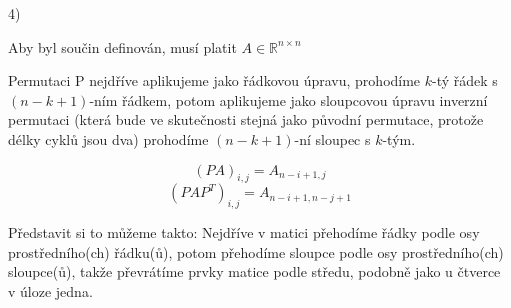 \documentclass[10pt,a4paper]{article}
\begin{document}
\hfill

4) 

Aby byl součin definován, musí platit $A \in \mathbb{R}^{n \times n}$

Permutaci P nejdříve aplikujeme jako řádkovou úpravu, prohodíme $k$-tý řádek s $(n-k + 1)$-ním řádkem, potom aplikujeme jako sloupcovou úpravu inverzní permutaci (která bude ve skutečnosti stejná jako původní permutace, protože délky cyklů jsou dva) prohodíme $(n-k + 1)$-ní sloupec s $k$-tým.


\begin{equation*}
(PA)_{i,j} = A_{n-i+1,j}
\end{equation*}
\begin{equation*}
(PAP^T)_{i,j} = A_{n-i+1,n-j+1}
\end{equation*}

Představit si to můžeme takto: Nejdříve v matici přehodíme řádky podle osy prostředního(ch) řádku(ů), potom přehodíme sloupce podle osy prostředního(ch) sloupce(ů), takže převrátíme prvky matice podle středu, podobně jako u čtverce v úloze jedna.
\end{document}
